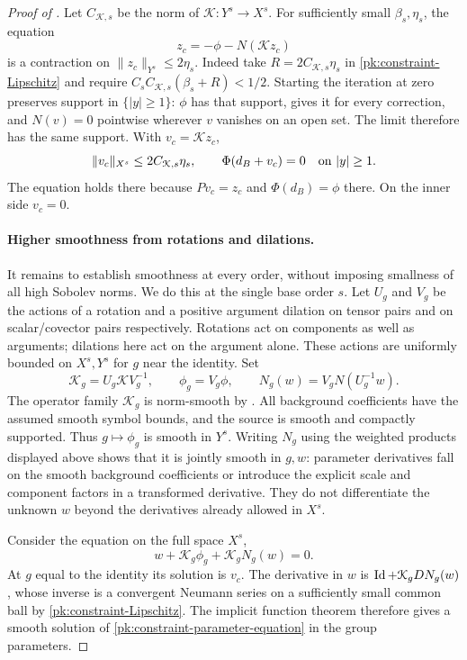 \begin{proof}[Proof of ]
Let \(C_{\mathcal K,s}\) be the norm of \(\mathcal K:Y^s\to X^s\).
For sufficiently small \(\beta_s,\eta_s\), the equation
\begin{equation}
 z_c=-\phi-N(\mathcal Kz_c)
 \label{pk:constraint-fixed-point}
\end{equation}
is a contraction on \(\|z_c\|_{Y^s}\leq2\eta_s\).  Indeed take
\(R=2C_{\mathcal K,s}\eta_s\) in
\eqref{pk:constraint-Lipschitz} and require
\(C_sC_{\mathcal K,s}(\beta_s+R)<1/2\).
Starting the iteration at zero preserves support in \(\{|y|\geq1\}\):
\(\phi\) has that support,
 gives it for every correction, and
\(N(v)=0\) pointwise wherever \(v\) vanishes on an open set.
The limit therefore has the same support.  With \(v_c=\mathcal Kz_c\),
\begin{equation}
 \|v_c\|_{X^s}\leq2C_{\mathcal K,s}\eta_s,\qquad
 \Phi(d_B+v_c)=0\quad\hbox{on } |y|\geq1.
 \label{pk:constraint-correction-bound}
\end{equation}
The equation holds there because \(Pv_c=z_c\) and
\(\Phi(d_B)=\phi\) there.  On the inner side \(v_c=0\).

\paragraph{Higher smoothness from rotations and dilations.}
It remains to establish smoothness at every order, without imposing
smallness of all high Sobolev norms.  We do this at the single base
order \(s\).  Let \(U_g\) and \(V_g\) be the actions of a rotation and
a positive argument dilation on tensor pairs and on scalar/covector
pairs respectively.  Rotations act on components as well as arguments;
dilations here act on the argument alone.  These actions are uniformly
bounded on \(X^s,Y^s\) for \(g\) near the identity.  Set
\[
 \mathcal K_g=U_g\mathcal K V_g^{-1},\qquad
 \phi_g=V_g\phi,\qquad
 N_g(w)=V_gN(U_g^{-1}w).
\]
The operator family \(\mathcal K_g\) is norm-smooth by
.  All background coefficients have the assumed smooth symbol bounds,
and the source is smooth and compactly supported.  Thus \(g\mapsto\phi_g\) is smooth in \(Y^s\).
Writing \(N_g\) using the weighted products displayed above shows
that it is jointly smooth in \(g,w\): parameter derivatives fall on
the smooth background coefficients or introduce the explicit scale
and component factors in a transformed derivative.  They do not
differentiate the unknown \(w\) beyond the derivatives already
allowed in \(X^s\).

Consider the equation on the full space \(X^s\),
\begin{equation}
 w+\mathcal K_g\phi_g+\mathcal K_gN_g(w)=0.
 \label{pk:constraint-parameter-equation}
\end{equation}
At \(g\) equal to the identity its solution is \(v_c\).
The derivative in \(w\) is
\(\operatorname{Id}+\mathcal K_gD N_g(w)\), whose inverse is a convergent Neumann
series on a sufficiently small common ball by
\eqref{pk:constraint-Lipschitz}.  The implicit function theorem
therefore gives a smooth solution of
\eqref{pk:constraint-parameter-equation} in the group parameters.


\end{proof}
